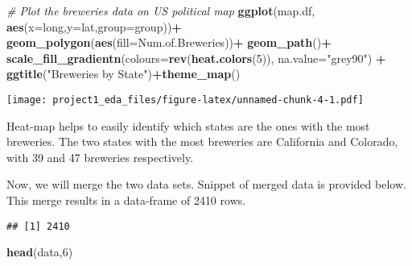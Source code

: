 \documentclass[]{article}
\newenvironment{Shaded}{\begin{snugshade}}{\end{snugshade}}
\newcommand{\CommentTok}[1]{\textcolor[rgb]{0.56,0.35,0.01}{\textit{#1}}}
\newcommand{\DataTypeTok}[1]{\textcolor[rgb]{0.13,0.29,0.53}{#1}}
\newcommand{\DecValTok}[1]{\textcolor[rgb]{0.00,0.00,0.81}{#1}}
\newcommand{\KeywordTok}[1]{\textcolor[rgb]{0.13,0.29,0.53}{\textbf{#1}}}
\newcommand{\NormalTok}[1]{#1}
\newcommand{\OperatorTok}[1]{\textcolor[rgb]{0.81,0.36,0.00}{\textbf{#1}}}
\newcommand{\StringTok}[1]{\textcolor[rgb]{0.31,0.60,0.02}{#1}}
\begin{document}
\begin{Shaded}
\begin{Highlighting}[]
\CommentTok{# Plot the breweries data on US political map}
\KeywordTok{ggplot}\NormalTok{(map.df, }\KeywordTok{aes}\NormalTok{(}\DataTypeTok{x=}\NormalTok{long,}\DataTypeTok{y=}\NormalTok{lat,}\DataTypeTok{group=}\NormalTok{group))}\OperatorTok{+}
\StringTok{  }\KeywordTok{geom_polygon}\NormalTok{(}\KeywordTok{aes}\NormalTok{(}\DataTypeTok{fill=}\NormalTok{Num.of.Breweries))}\OperatorTok{+}
\StringTok{  }\KeywordTok{geom_path}\NormalTok{()}\OperatorTok{+}\StringTok{ }
\StringTok{  }\KeywordTok{scale_fill_gradientn}\NormalTok{(}\DataTypeTok{colours=}\KeywordTok{rev}\NormalTok{(}\KeywordTok{heat.colors}\NormalTok{(}\DecValTok{5}\NormalTok{)), }\DataTypeTok{na.value=}\StringTok{"grey90"}\NormalTok{) }\OperatorTok{+}\StringTok{ }\KeywordTok{ggtitle}\NormalTok{(}\StringTok{"Breweries by State"}\NormalTok{)}\OperatorTok{+}\KeywordTok{theme_map}\NormalTok{()}
\end{Highlighting}
\end{Shaded}

\texttt{[image: project1\_eda\_files/figure-latex/unnamed-chunk-4-1.pdf]}

Heat-map helps to easily identify which states are the ones with the
most breweries. The two states with the most breweries are California
and Colorado, with 39 and 47 breweries respectively.

Now, we will merge the two data sets. Snippet of merged data is provided
below. This merge results in a data-frame of 2410 rows.

\begin{Shaded}
\end{Shaded}

\begin{verbatim}
## [1] 2410
\end{verbatim}

\begin{Shaded}
\begin{Highlighting}[]
\KeywordTok{head}\NormalTok{(data,}\DecValTok{6}\NormalTok{)}
\end{Highlighting}
\end{Shaded}
\end{document}
